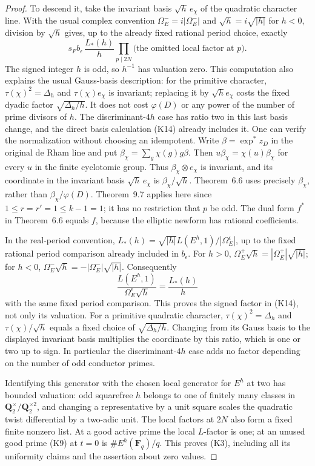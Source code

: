 \documentclass[11pt]{article}
\theoremstyle{definition}
\theoremstyle{remark}
\begin{document}
\begin{proof}
To descend it, take the invariant basis $\sqrt h\,e_\chi$ of the
quadratic character line. With the usual complex convention
$\Omega_E^-=i|\Omega_E^-|$ and $\sqrt h=i\sqrt{|h|}$ for $h<0$,
division by $\sqrt h$ gives, up to the already fixed rational
period choice, exactly
\[
             s_F b_\epsilon\,\frac{L_*(h)}{h}
       \prod_{p\mid 2N}\text{(the omitted local factor at $p$)}.
                                                               \tag{K14}
\]
The signed integer $h$ is odd, so $h^{-1}$ has valuation zero.
This computation also explains the usual Gauss-basis description:
for the primitive character, $\tau(\chi)^2=\Delta_h$ and
$\tau(\chi)e_\chi$ is invariant; replacing it by $\sqrt h e_\chi$
costs the fixed dyadic factor $\sqrt{\Delta_h/h}$. It does not cost
$\varphi(D)$ or any power of the number of prime divisors of $h$.
The discriminant-$4h$ case has ratio two in this last basis change,
and the direct basis calculation (K14) already includes it.
One can verify the normalization without choosing an idempotent.
Write $\beta=\exp^*z_D$ in the original de Rham line and put
$\beta_\chi=\sum_g\chi(g)g\beta$. Then
$u\beta_\chi=\chi(u)\beta_\chi$ for every $u$ in the finite
cyclotomic group. Thus $\beta_\chi\otimes e_\chi$ is invariant,
and its coordinate in the invariant basis
$\sqrt h\,e_\chi$ is $\beta_\chi/\sqrt h$.
Theorem~6.6 uses precisely $\beta_\chi$, rather than
$\beta_\chi/\varphi(D)$. Theorem~9.7 applies here since
$1\le r=r'=1\le k-1=1$; it has no restriction that $p$ be odd.
The dual form $f^*$ in Theorem~6.6 equals $f$, because the elliptic
newform has rational coefficients.

In the real-period convention,
$L_*(h)=\sqrt{|h|}L(E^h,1)/|\Omega_E^\epsilon|$, up to the
fixed rational period comparison already included in $b_\epsilon$.
For $h>0$,
$\Omega_E^+\sqrt h=|\Omega_E^+|\sqrt{|h|}$; for $h<0$,
$\Omega_E^-\sqrt h=-|\Omega_E^-|\sqrt{|h|}$.
Consequently
\[
 \frac{L(E^h,1)}{\Omega_E^\epsilon\sqrt h}
     =\frac{L_*(h)}{h}
\]
with the same fixed period comparison. This proves the signed
factor in (K14), not only its valuation. For a primitive quadratic
character, $\tau(\chi)^2=\Delta_h$ and
$\tau(\chi)/\sqrt h$ equals a fixed choice of
$\sqrt{\Delta_h/h}$. Changing from its Gauss basis to the displayed
invariant basis multiplies the coordinate by this ratio, which
is one or two up to sign. In particular the discriminant-$4h$
case adds no factor depending on the number of odd conductor primes.


Identifying this generator with the chosen local generator for
$E^h$ at two has bounded valuation: odd squarefree $h$ belongs to
one of finitely many classes in $\mathbf Q_2^\times/\mathbf Q_2^{\times2}$,
and changing a representative by a unit square scales the quadratic
twist differential by a two-adic unit. The local factors at $2N$
also form a fixed finite nonzero list. At a good active prime the
local $L$-factor is one; at an unused good prime (K9) at $t=0$ is
$\#E^h(\mathbf F_q)/q$. This proves (K3), including all its
uniformity claims and the assertion about zero values.


\end{proof}
\end{document}
